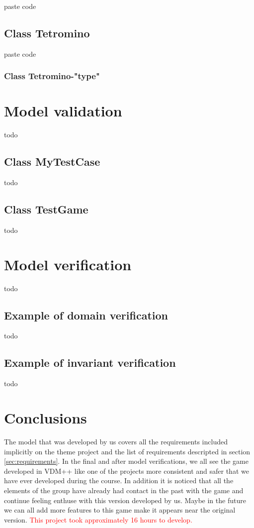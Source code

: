 \documentclass[a4paper]{article}
\begin{document}
paste code

\subsection{Class Tetromino}

paste code

\subsubsection{Class Tetromino-"type"}


\section{Model validation}

todo

\subsection{Class MyTestCase} 

todo

\subsection{Class TestGame} 

todo

\section{Model verification}

todo

\subsection{Example of domain verification} 

todo

\subsection{Example of invariant verification} 

todo

\section{Conclusions} 

The model that was developed by us covers all the requirements included implicitly on the theme project and the list of requirements descripted in section \ref{sec:requirements}.
In the final and after model verifications, we all see the game developed in VDM++ like one of the projects more consistent and safer that we have ever developed during the course. 
In addition it is noticed that all the elements of the group have already had contact in the past with the game and continue feeling enthuse with this version developed by us. Maybe in the future we can all add more features to this game make it appears near the original version.
\textcolor{red}{This project took approximately 16 hours to develop.}
\end{document}
